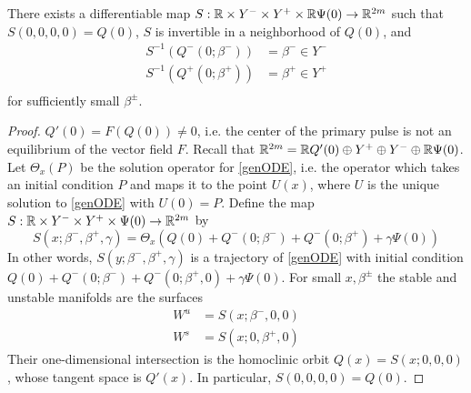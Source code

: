 \documentclass[thesis.tex]{subfiles}
\begin{document}
\begin{lemma}\label{straightenW}
There exists a differentiable map $S: \mathbb{R} \times Y^- \times Y^+ \times \mathbb{R}\Psi(0) \rightarrow \mathbb{R}^{2m}$ such that $S(0, 0, 0, 0) = Q(0)$, $S$ is invertible in a neighborhood of $Q(0)$, and
\begin{align*}
S^{-1}(Q^-(0; \beta^-)) &= \beta^- \in Y^- \\
S^{-1}(Q^+(0; \beta^+)) &= \beta^+ \in Y^+ \\
\end{align*}
for sufficiently small $\beta^\pm$.
\begin{proof}
$Q'(0) = F(Q(0)) \neq 0$, i.e. the center of the primary pulse is not an equilibrium of the vector field $F$. Recall that $\mathbb{R}^{2m} = \mathbb{R} Q'(0) \oplus Y^+ \oplus Y^- \oplus \mathbb{R} \Psi(0)$. Let $\Theta_x(P)$ be the solution operator for \eqref{genODE}, i.e. the operator which takes an initial condition $P$ and maps it to the point $U(x)$, where $U$ is the unique solution to \eqref{genODE} with $U(0) = P$. Define the map $S: \mathbb{R} \times Y^- \times Y^+ \times \Psi(0) \rightarrow \mathbb{R}^{2m}$ by 
\begin{equation}\label{flowboxdefS}
S(x; \beta^-, \beta^+, \gamma) = \Theta_x\left(Q(0) + Q^-(0; \beta^-) + Q^-(0; \beta^+) + \gamma \Psi(0)\right)
\end{equation}
In other words, $S(y; \beta^-, \beta^+, \gamma)$ is a trajectory of \eqref{genODE} with initial condition $Q(0) + Q^-(0; \beta^-) + Q^-(0; \beta^+,0) + \gamma \Psi(0)$. For small $x, \beta^\pm$ the stable and unstable manifolds are the surfaces
\begin{align*}
W^u &= S(x; \beta^-, 0, 0) \\
W^s &= S(x; 0, \beta^+, 0) 
\end{align*}
Their one-dimensional intersection is the homoclinic orbit $Q(x) = S(x; 0, 0, 0)$, whose tangent space is $Q'(x)$. In particular, $S(0, 0, 0, 0) = Q(0)$.


\end{proof}
\end{lemma}
\end{document}
